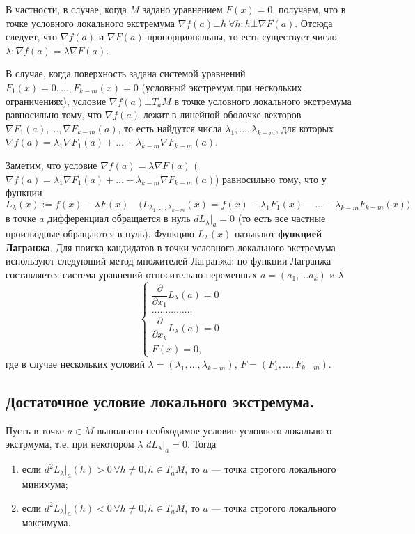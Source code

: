 \documentclass[a4paper]{article}
\theoremstyle{named}
\begin{document}
    В частности, в случае, когда $M$ задано уравнением $F(x)=0$, получаем, что в точке условного локального экстремума $\nabla f(a)\bot h\ \forall h\colon h\bot \nabla F(a)$.
    Отсюда следует, что $\nabla f(a)$ и $\nabla F(a)$ пропорциональны, то есть существует число $\lambda\colon \nabla f(a)= \lambda\nabla F(a)$.
    
    В случае, когда поверхность задана системой уравнений $F_1(x)=0,\ldots, F_{k-m}(x)=0$ (условный экстремум при нескольких ограничениях), условие $\nabla f(a)\bot T_aM$ в точке условного локального экстремума равносильно тому, что $\nabla f(a)$ лежит в линейной оболочке векторов $\nabla F_1(a), \ldots, \nabla F_{k-m}(a)$, то есть найдутся числа $\lambda_1,\ldots, \lambda_{k-m}$, для которых
    $\nabla f(a) = \lambda_1\nabla F_1(a)+\ldots+\lambda_{k-m}\nabla F_{k-m}(a)$.
    
    Заметим, что условие $\nabla f(a)= \lambda\nabla F(a)$ ($\nabla f(a) = \lambda_1\nabla F_1(a)+\ldots+\lambda_{k-m}\nabla F_{k-m}(a)$) равносильно тому, что у функции
    $$
        L_\lambda(x):= f(x)-\lambda F(x)\quad\bigl(L_{\lambda_1,\ldots,\lambda_{k-m}}(x) = f(x)- \lambda_1F_1(x)-\ldots-\lambda_{k-m}F_{k-m}(x)\bigr)
    $$
    в точке $a$ дифференциал обращается в нуль $dL_\lambda\bigl|_a=0$ (то есть все частные производные обращаются в нуль).
    Функцию $L_\lambda(x)$ называют \textbf{функцией Лагранжа}. Для поиска кандидатов в точки условного локального экстремума используют следующий метод множителей Лагранжа:
    по функции Лагранжа составляется система уравнений относительно переменных $a=(a_1,\ldots a_k)$ и $\lambda$
    $$
        \begin{cases}
            \dfrac{\partial}{\partial x_1}L_\lambda(a)=0\\
              \ldots\ldots\ldots\ldots\ldots\\
            \dfrac{\partial }{\partial x_k}L_\lambda(a)=0\\
            F(x)=0,
        \end{cases}
    $$
    где в случае нескольких условий $\lambda = (\lambda_1,\ldots,\lambda_{k-m})$, $F=(F_1,\ldots, F_{k-m})$.
    
    \subsection{Достаточное условие локального экстремума.}
    
    \begin{theorem*}
        Пусть в точке $a\in M$ выполнено необходимое условие условного локального экстрмума, т.е. при некотором $\lambda$ $dL_\lambda\bigl|_a=0$.
        Тогда
        \begin{enumerate}
        \item
            если $d^2L_\lambda\bigl|_a(h)>0\, \forall h\ne0, h\in T_aM$, то $a$ --- точка строгого локального минимума;
    
        \item
            если $d^2L_\lambda\bigl|_a(h)<0\, \forall h\ne0, h\in T_aM$, то $a$ --- точка строгого локального максимума.
        \end{enumerate}
    \end{theorem*}
    
\end{document}
